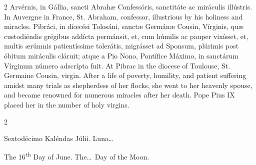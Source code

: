 \begin{paracol}{2}
Arvérnis, in Gállia, 
 sancti Abrahæ Confessóris, sanctitáte ac miráculis illústris.
\switchcolumn
{}
In Auvergne in France, St. Abraham, 
 confessor, illustrious by his holiness and miracles.
\switchcolumn*
{}
Pibráci, in diœcési 
 Tolosáni, sanctæ Germánæ Cousin, Vírginis, quæ custodiéndis grégibus addícta 
 permánsit, et, cum húmilis ac pauper vixísset, et, multis ærúmnis 
 patientíssime tolerátis, migrásset ad Sponsum, plúrimis post óbitum 
 miráculis cláruit; atque a Pio Nono, Pontífice Máximo, in sanctárum Vírginum 
 número adscrípta fuit.
\switchcolumn
{}
At Pibrac in the diocese of 
 Toulouse, St. Germaine Cousin, virgin. After a life of poverty, 
 humility, and patient suffering amidst many trials as shepherdess of her 
 flocks, she went to her heavenly spouse, and became renowned for numerous 
 miracles after her death. Pope Pius IX placed her in the number of 
 holy virgins.
\switchcolumn*
{}
\end{paracol}


\begin{paracol}{2}
\begin{center}{\color{gregoriocolor} Sextodécimo Kaléndas Júlii. 
 Luna\dots\ }\end{center}
\switchcolumn
{}
\begin{center}{\color{gregoriocolor} The 16\textsuperscript{th} Day of 
 June. The\dots\ Day of the Moon.}\end{center}
\end{paracol}

